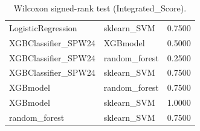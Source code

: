 \begin{table}[t]
\begin{tabular}{llr}
LogisticRegression & sklearn_SVM & 0.7500 \\
XGBClassifier_SPW24 & XGBmodel & 0.5000 \\
XGBClassifier_SPW24 & random_forest & 0.2500 \\
XGBClassifier_SPW24 & sklearn_SVM & 0.7500 \\
XGBmodel & random_forest & 0.7500 \\
XGBmodel & sklearn_SVM & 1.0000 \\
random_forest & sklearn_SVM & 0.7500 \\
\bottomrule
\end{tabular}
\caption{Wilcoxon signed-rank test (Integrated_Score).}
\label{tab:wilcoxon_Integrated_Score}
\end{table}